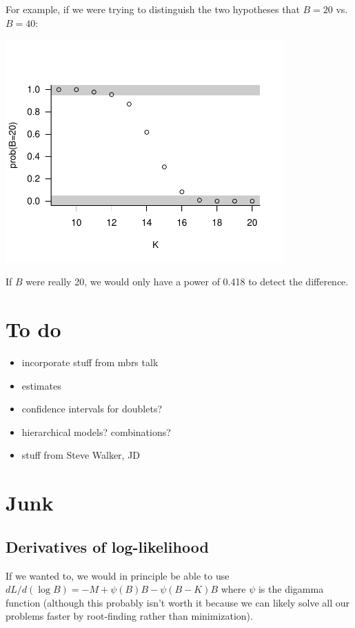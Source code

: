 \documentclass{article}\usepackage[]{graphicx}\usepackage[]{color}
\newenvironment{knitrout}{}{} %
\begin{document}
For example, if we were trying to distinguish the two
hypotheses that $B=20$ vs. $B=40$:

\begin{knitrout}
\color{fgcolor}
\includegraphics[width=0.8\textwidth]{figure/expkb2-1} 

\end{knitrout}
If $B$ were really 20, we would only have
a power of 0.418 to detect the difference.

\section{To do}
\begin{itemize}
\item incorporate stuff from mbrs talk
\item estimates
\item confidence intervals for doublets?
\item hierarchical models?  combinations?
\item stuff from Steve Walker, JD
\end{itemize}

\section{Junk}

\subsection{Derivatives of log-likelihood}
If we wanted to, we would in principle be able to 
use $dL/d(\log B)=-M + \psi(B) B - \psi(B-K) B$
where $\psi$ is the digamma function (although this
probably isn't worth it because we can likely solve
all our problems faster by root-finding rather than
minimization).
\end{document}
